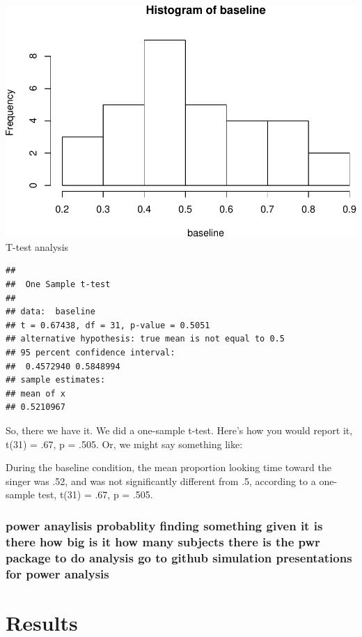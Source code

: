 \documentclass[man]{apa6}
\begin{document}
\includegraphics{Papa_files/figure-latex/unnamed-chunk-1-1.pdf} T-test
analysis

\begin{verbatim}
## 
##  One Sample t-test
## 
## data:  baseline
## t = 0.67438, df = 31, p-value = 0.5051
## alternative hypothesis: true mean is not equal to 0.5
## 95 percent confidence interval:
##  0.4572940 0.5848994
## sample estimates:
## mean of x 
## 0.5210967
\end{verbatim}

So, there we have it. We did a one-sample t-test. Here's how you would
report it, t(31) = .67, p = .505. Or, we might say something like:

During the baseline condition, the mean proportion looking time toward
the singer was .52, and was not significantly different from .5,
according to a one-sample test, t(31) = .67, p = .505.

\subsubsection{power anaylisis probablity finding something given it is
there how big is it how many subjects there is the pwr package to do
analysis go to github simulation presentations for power
analysis}\label{power-anaylisis-probablity-finding-something-given-it-is-there-how-big-is-it-how-many-subjects-there-is-the-pwr-package-to-do-analysis-go-to-github-simulation-presentations-for-power-analysis}

\section{Results}\label{results}
\end{document}
